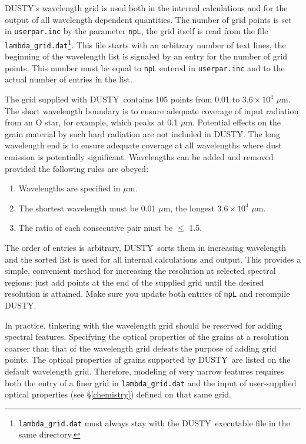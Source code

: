 \documentclass[11pt]{article}
\def\D  {{\sf DUSTY}}
\def\mic    {\hbox{$\mu$m}}
\begin{document}
\D's wavelength grid is used both in the internal calculations and for the
output of all wavelength dependent quantities. The number of grid points is set
in {\tt userpar.inc} by the parameter {\tt npL}, the grid itself is read from
the file {\tt lambda\_grid.dat}\footnote{{\tt lambda\_grid.dat} must always
stay with the \D\ executable file in the same directory.}. This file starts
with an arbitrary number of text lines, the beginning of the wavelength list is
signaled by an entry for the number of grid points.  This number must be equal
to {\tt npL} entered in {\tt userpar.inc} and to the actual number of entries
in the list.

The grid supplied with \D\ contains 105 points from 0.01 to $3.6\times10^{4}$
\mic.  The short wavelength boundary is to ensure adequate coverage of input
radiation from an O star, for example, which peaks at 0.1 \mic.  Potential
effects on the grain material by such hard radiation are not included in \D.
The long wavelength end is to ensure adequate coverage at all wavelengths where
dust emission is potentially significant. Wavelengths can be added and removed
provided the following rules are obeyed:
\begin{enumerate}
\item
Wavelengths are specified in \mic.
\item
The shortest wavelength must be 0.01 \mic, the longest $3.6\times10^{4}$ \mic.
\item
The ratio of each consecutive pair must be $\le$ 1.5.
\end{enumerate}
The order of entries is arbitrary, \D\ sorts them in increasing wavelength and
the sorted list is used for all internal calculations and output.  This
provides a simple, convenient method for increasing the resolution at selected
spectral regions: just add points at the end of the supplied grid until the
desired resolution is attained.  Make sure you update both entries of {\tt npL}
and recompile \D.

In practice, tinkering with the wavelength grid should be reserved for adding
spectral features. Specifying the optical properties of the grains at a
resolution coarser than that of the wavelength grid defeats the purpose of
adding grid points. The optical properties of grains supported by \D\ are
listed on the default wavelength grid.  Therefore, modeling of very narrow
features requires both the entry of a finer grid in {\tt lambda\_grid.dat} and
the input of user-supplied optical properties (see \S\ref{chemistry}) defined
on that same grid.
\end{document}
